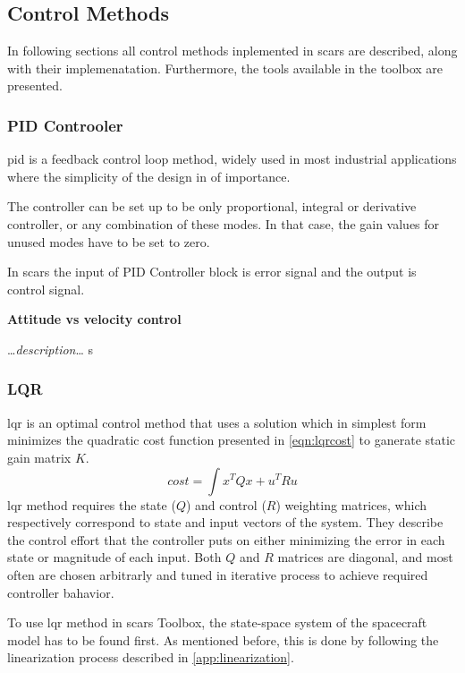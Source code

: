\subsection{Control Methods}\label{sec:control}
    In following sections all control methods inplemented in \ac{scars} are described, along with their implemenatation. Furthermore, the tools available in the toolbox are presented. 
    
    \subsubsection{PID Controoler}
        \ac{pid} is a feedback control loop method, widely used in most industrial applications where the simplicity of the design in of importance. 
        
        

        The controller can be set up to be only proportional, integral or derivative controller, or any combination of these modes. In that case, the gain values for unused modes have to be set to zero.

        In \ac{scars} the input of PID Controller block is error signal and the output is control signal.
        
        \textbf{Attitude vs velocity control}

            \dots\textit{description}\dots
    s
    \subsubsection{LQR}\label{sec:lqr}
        \ac{lqr} is an optimal control method that uses a solution which in simplest form minimizes the quadratic cost function presented in \autoref{eqn:lqrcost} to ganerate static gain matrix $K$.
        \begin{equation}
            cost = \int{x^TQx+u^TRu}
        \end{equation}\label{eqn:lqrcost}
        \ac{lqr} method requires the state ($Q$) and control ($R$) weighting matrices, which respectively correspond to state and input vectors of the system. They describe the control effort that the controller puts on either minimizing the error in each state or magnitude of each input. Both $Q$ and $R$ matrices are diagonal, and most often are chosen arbitrarly and tuned in iterative process to achieve required controller bahavior.

        To use \ac{lqr} method in \ac{scars} Toolbox, the state-space system of the spacecraft model has to be found first. As mentioned before, this is done by following the linearization process described in \autoref{app:linearization}.

